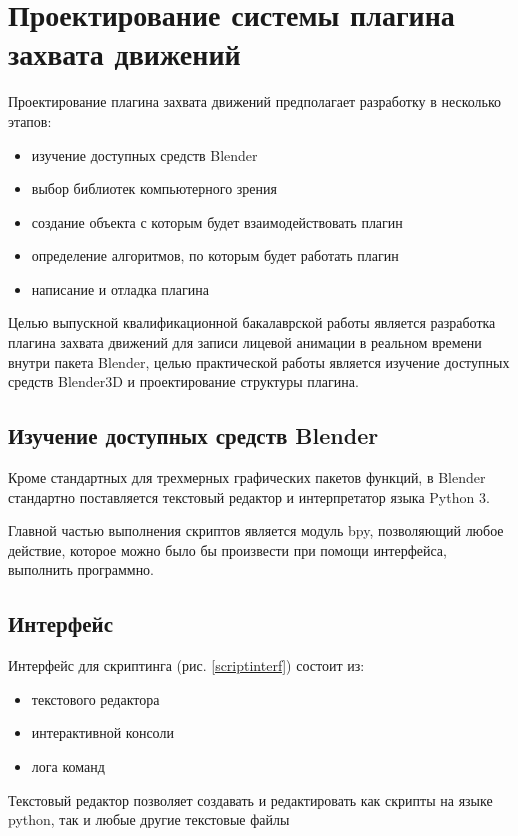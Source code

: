 \section{Проектирование системы плагина захвата движений}

Проектирование плагина захвата движений предполагает разработку в несколько этапов:
\begin{itemize}
	\item изучение доступных средств Blender
	\item выбор библиотек компьютерного зрения
	\item создание объекта с которым будет взаимодействовать плагин
	\item определение алгоритмов, по которым будет работать плагин
	\item написание и отладка плагина
\end{itemize}

Целью выпускной квалификационной бакалаврской работы является разработка плагина захвата движений для записи лицевой анимации в реальном времени внутри пакета Blender, целью практической работы является изучение доступных средств Blender3D и проектирование структуры плагина.

\subsection{Изучение доступных средств Blender}

Кроме стандартных для трехмерных графических пакетов функций, в Blender стандартно поставляется текстовый редактор и интерпретатор языка Python 3.

Главной частью выполнения скриптов является модуль bpy, позволяющий любое действие, которое можно было бы произвести при помощи интерфейса, выполнить программно.

\subsection{Интерфейс}
Интерфейс для скриптинга (рис. \ref{scriptinterf}) состоит из:
\begin{itemize}
	\item текстового редактора
	\item интерактивной консоли
	\item лога команд
\end{itemize}

Текстовый редактор позволяет создавать и редактировать как скрипты на языке python, так и любые другие текстовые файлы


